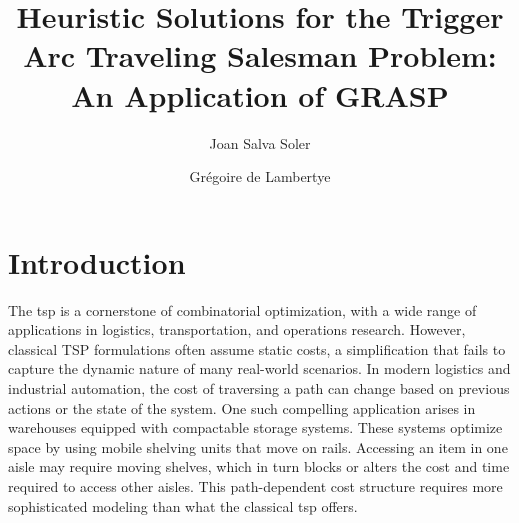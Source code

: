 \documentclass[twocolumn, switch]{article} %
\title{Heuristic Solutions for the Trigger Arc Traveling Salesman Problem: An Application of GRASP}
\author[1]{Joan Salva Soler\orcidA{}}
\author[2]{Grégoire de Lambertye\orcidB{}}
\affil[1]{H2O.ai, TU Wien}
\affil[2]{TU Wien}
\begin{document}



{}

\section{Introduction}
The \gls{tsp} is a cornerstone of combinatorial optimization, with a wide range of applications in logistics, transportation, and operations research. 
However, classical TSP formulations often assume static costs, a simplification that fails to capture the dynamic nature of many real-world scenarios. 
In modern logistics and industrial automation, the cost of traversing a path can change based on previous actions or the state of the system. 
One such compelling application arises in warehouses equipped with compactable storage systems. 
These systems optimize space by using mobile shelving units that move on rails. 
Accessing an item in one aisle may require moving shelves, which in turn blocks or alters the cost and time required to access other aisles. 
This path-dependent cost structure requires more sophisticated modeling than what the classical \gls{tsp} offers. 
\end{document}
